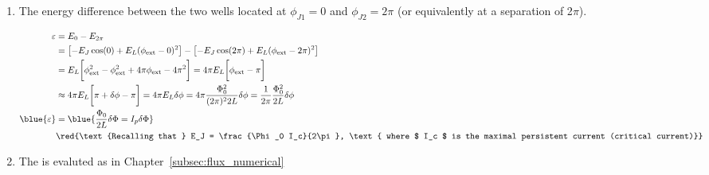 \begin{enumerate}
\item  The   energy  difference  between   the  two  wells   located  at
  $\phi_{J1}=0$ and $ \phi_{J2}=2\pi $  (or equivalently at a separation
  of 2$ \pi $).

  \begin{equation}
    \begin{aligned}
      \varepsilon &= E_0 - E_{2\pi} \\
      & = \left[-E_J\cos(0) + E_L(\phi_\text{ext}-0)^2\right] - \left[-E_J\cos(2\pi) + E_L(\phi_\text{ext}-2\pi)^2\right]\\
      & = E_L\bigg[\phi_\text{ext}^2 -\phi_\text{ext}^2 +4\pi\phi_\text{ext} -4\pi^2\bigg] =  4\pi E_L\bigg[\phi_\text{ext} -\pi\bigg]\\
      & \approx 4\pi E_L\bigg[\pi+\delta\phi -\pi\bigg] = 4\pi E_L\delta\phi = 4\pi \frac{\Phi_0^2}{(2\pi)^22L} \delta\phi = {\frac{1}{2\pi}\frac{\Phi_0^2}{2L}\delta\phi}\\
      \blue{\varepsilon} & = \blue{\frac{\Phi_0}{2L}\delta\Phi = I_p\delta\Phi}\\
      & \red{\text{Recalling that } E_J = \frac{\Phi_0 I_c}{2\pi}, \text{ where $ I_c $ is the maximal persistent current (critical current)}}\\
    \end{aligned}
  \end{equation}


\item                The                 is evaluted  as in
  Chapter~\ref{subsec:flux_numerical}


\end{enumerate}
